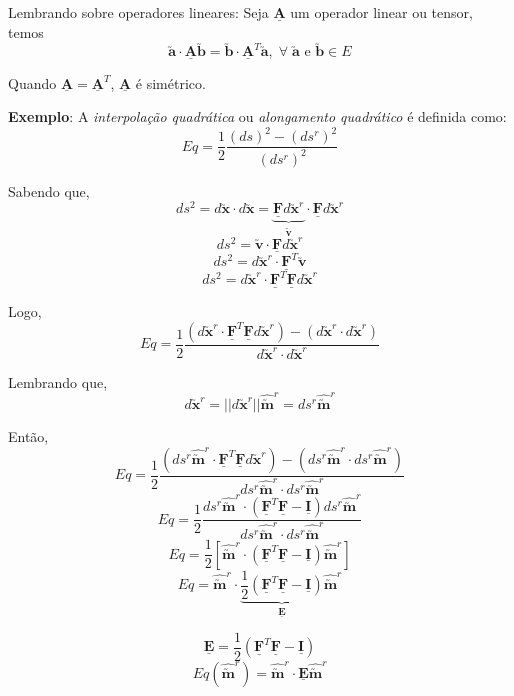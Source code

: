 	Lembrando sobre operadores lineares: Seja $\underline{\mathbf{A}}$ um operador linear ou tensor, temos
	\[\utilde{\mathbf{a}}\cdot\underline{\mathbf{A}}\utilde{\mathbf{b}}=\utilde{\mathbf{b}}\cdot\underline{\mathbf{A}}^T\utilde{\mathbf{a}},\;\forall\;\mathbf{\utilde{\mathbf{a}}}\text{ e }\mathbf{\utilde{\mathbf{b}}}\in\text{$E$}\]
	
	Quando $\underline{\mathbf{A}}=\underline{\mathbf{A}}^T$, $\underline{\mathbf{A}}$ é simétrico.
	
	\textbf{Exemplo}: A \textit{interpolação quadrática} ou \textit{alongamento quadrático} é definida como:
	\[Eq=\frac{1}{2}\frac{(ds)^2-(ds^r)^2}{(ds^r)^2}\]
	
	Sabendo que,
	\[ds^2=d\utilde{\mathbf{x}}\cdot d\utilde{\mathbf{x}}=\underbrace{\underline{\mathbf{F}}d\utilde{\mathbf{x}}^r}_{\displaystyle\utilde{\mathbf{v}}}\cdot\underline{\mathbf{F}}d\utilde{\mathbf{x}}^r\]
	\[ds^2=\utilde{\mathbf{v}}\cdot\underline{\mathbf{F}}d\utilde{\mathbf{x}}^r\]
	\[ds^2=d\utilde{\mathbf{x}}^r\cdot\underline{\mathbf{F}}^T\utilde{\mathbf{v}}\]
	\[ds^2=d\utilde{\mathbf{x}}^r\cdot\underline{\mathbf{F}}^T\underline{\mathbf{F}}d\utilde{\mathbf{x}}^r\]
	
	Logo,
	\[Eq=\frac{1}{2}\frac{(d\utilde{\mathbf{x}}^r\cdot\underline{\mathbf{F}}^T\underline{\mathbf{F}}d\utilde{\mathbf{x}}^r)-(d\utilde{\mathbf{x}}^r\cdot d\utilde{\mathbf{x}}^r)}{d\utilde{\mathbf{x}}^r\cdot d\utilde{\mathbf{x}}^r}\]
	
	Lembrando que,
	\[d\utilde{\mathbf{x}}^r=||d\utilde{\mathbf{x}}^r||\hat{\utilde{\mathbf{m}}}^r=ds^r\hat{\utilde{\mathbf{m}}}^r\]
	
	Então,
	\[Eq=\frac{1}{2}\frac{(ds^r\hat{\utilde{\mathbf{m}}}^r\cdot\underline{\mathbf{F}}^T\underline{\mathbf{F}}d\utilde{\mathbf{x}}^r)-(ds^r\hat{\utilde{\mathbf{m}}}^r\cdot ds^r\hat{\utilde{\mathbf{m}}}^r)}{ds^r\hat{\utilde{\mathbf{m}}}^r\cdot ds^r\hat{\utilde{\mathbf{m}}}^r}\]
	\[Eq=\frac{1}{2}\frac{ds^r\hat{\utilde{\mathbf{m}}}^r\cdot(\underline{\mathbf{F}}^T\underline{\mathbf{F}}-\underline{\mathbf{I}})ds^r\hat{\utilde{\mathbf{m}}}^r}{ds^r\hat{\utilde{\mathbf{m}}}^r\cdot ds^r\hat{\utilde{\mathbf{m}}}^r}\]
	\[Eq=\frac{1}{2}[\hat{\utilde{\mathbf{m}}}^r\cdot(\underline{\mathbf{F}}^T\underline{\mathbf{F}}-\underline{\mathbf{I}})\hat{\utilde{\mathbf{m}}}^r]\]
	\[Eq=\hat{\utilde{\mathbf{m}}}^r\cdot\underbrace{\frac{1}{2}(\underline{\mathbf{F}}^T\underline{\mathbf{F}}-\underline{\mathbf{I}})}_{\displaystyle\underline{\mathbf{E}}}\hat{\utilde{\mathbf{m}}}^r\]
	
	\[\underline{\mathbf{E}}=\frac{1}{2}(\underline{\mathbf{F}}^T\underline{\mathbf{F}}-\underline{\mathbf{I}})\]
	\[Eq(\hat{\utilde{\mathbf{m}}}^r)=\hat{\utilde{\mathbf{m}}}^r\cdot\underline{\mathbf{E}}\hat{\utilde{\mathbf{m}}}^r\]
	
